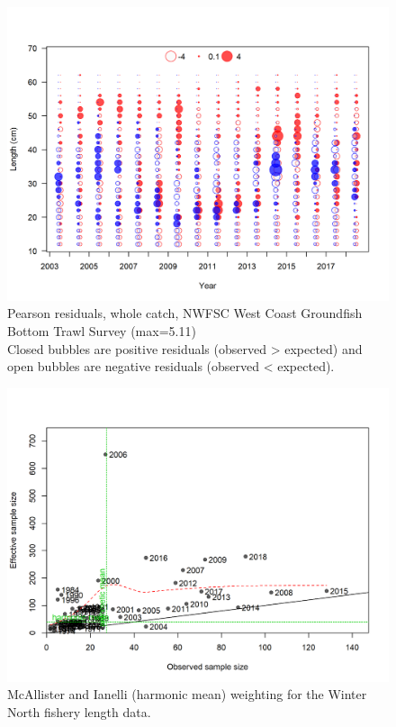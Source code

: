 \documentclass[12pt,]{article}
\begin{document}
\begin{figure}
\centering
\includegraphics{r4ss/plots_mod1/comp_lenfit_residsflt7mkt0.png}
\caption{Pearson residuals, whole catch, NWFSC West Coast Groundfish
Bottom Trawl Survey (max=5.11)\\
Closed bubbles are positive residuals (observed \textgreater{} expected)
and open bubbles are negative residuals (observed \textless{} expected).
\label{fig:nwfsc_combo_len_pearson}}
\end{figure}

\begin{figure}
\centering
\includegraphics{r4ss/plots_mod1/comp_lenfit_sampsize_flt1mkt2.png}
\caption{McAllister and Ianelli (harmonic mean) weighting for the Winter
North fishery length data. \label{fig:harm_mean_wn}}
\end{figure}
\end{document}
